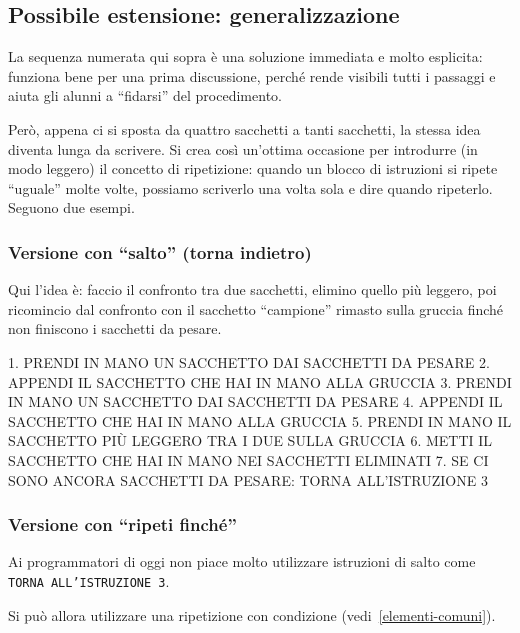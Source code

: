 \subsection{Possibile estensione: generalizzazione }\label{possibile-estensione-generalizzazione}


La sequenza numerata qui sopra è una soluzione immediata e molto esplicita: funziona bene per una prima discussione, perché rende visibili tutti i passaggi e aiuta gli alunni a ``fidarsi'' del procedimento.


Però, appena ci si sposta da quattro sacchetti a tanti sacchetti, la stessa idea diventa lunga da scrivere. Si crea così un'ottima occasione per introdurre (in modo leggero) il concetto di ripetizione: quando un blocco di istruzioni si ripete ``uguale'' molte volte, possiamo scriverlo una volta sola e dire quando ripeterlo. Seguono due esempi.

\subsubsection{Versione con ``salto'' (torna indietro)}\label{versione-con-salto-torna-indietro}

Qui l'idea è: faccio il confronto tra due sacchetti, elimino quello più leggero, poi ricomincio dal confronto con il sacchetto ``campione'' rimasto sulla gruccia finché non finiscono i sacchetti da pesare.

{\small
\begin{pseudocodice}
1. PRENDI IN MANO UN SACCHETTO DAI SACCHETTI DA PESARE
2. APPENDI IL SACCHETTO CHE HAI IN MANO ALLA GRUCCIA
3. PRENDI IN MANO UN SACCHETTO DAI SACCHETTI DA PESARE
4. APPENDI IL SACCHETTO CHE HAI IN MANO ALLA GRUCCIA
5. PRENDI IN MANO IL SACCHETTO PIÙ LEGGERO TRA I DUE SULLA GRUCCIA
6. METTI IL SACCHETTO CHE HAI IN MANO NEI SACCHETTI ELIMINATI
7. SE CI SONO ANCORA SACCHETTI DA PESARE: TORNA ALL'ISTRUZIONE 3
\end{pseudocodice}
}

\subsubsection{Versione con ``ripeti finché''}\label{versione-con-ripeti-finchuxe9}

Ai programmatori di oggi non piace molto utilizzare istruzioni di salto come\\ \texttt{TORNA ALL'ISTRUZIONE 3}.

Si può allora utilizzare una ripetizione con condizione (vedi~\ref{elementi-comuni}).

